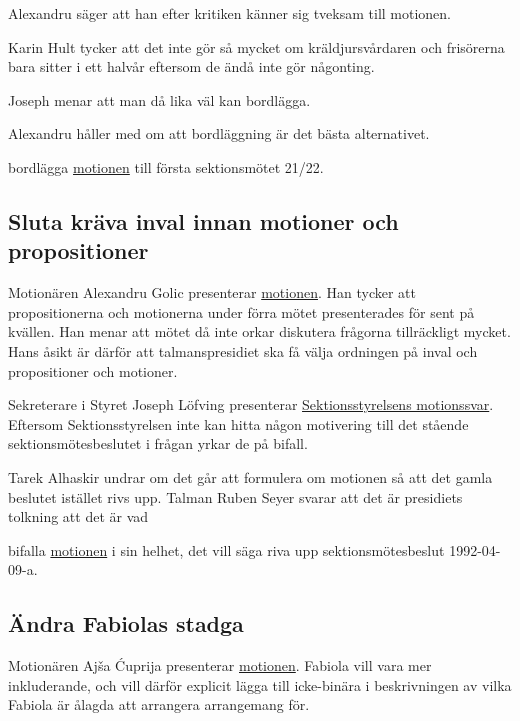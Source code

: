 \documentclass[hidelinks]{sektionsmote}
\begin{document}
Alexandru säger att han efter kritiken känner sig tveksam till motionen.

Karin Hult tycker att det inte gör så mycket om kräldjursvårdaren och frisörerna bara sitter i ett halvår eftersom de ändå inte gör någonting.

Joseph menar att man då lika väl kan bordlägga.

Alexandru håller med om att bordläggning är det bästa alternativet.

\begin{beslut}
  \item bordlägga \hyperlink{bilagor/motion/a.pdf.1}{motionen} till första sektionsmötet 21/22.
\end{beslut}

\subsection{Sluta kräva inval innan motioner och propositioner}
Motionären Alexandru Golic presenterar \hyperlink{bilagor/motion/b.pdf.1}{motionen}.
Han tycker att propositionerna och motionerna under förra mötet presenterades för sent på kvällen.
Han menar att mötet då inte orkar diskutera frågorna tillräckligt mycket.
Hans åsikt är därför att talmanspresidiet ska få välja ordningen på inval och propositioner och motioner.

Sekreterare i Styret Joseph Löfving presenterar \hyperlink{bilagor/motion/bsvar.pdf.1}{Sektionsstyrelsens motionssvar}.
Eftersom Sektionsstyrelsen inte kan hitta någon motivering till det stående sektionsmötesbeslutet i frågan yrkar de på bifall.

Tarek Alhaskir undrar om det går att formulera om motionen så att det gamla beslutet istället rivs upp.
Talman Ruben Seyer svarar att det är presidiets tolkning att det är vad

\begin{beslut}
  \item bifalla \hyperlink{bilagor/motion/b.pdf.1}{motionen} i sin helhet, det vill säga riva upp sektionsmötesbeslut 1992-04-09-a.
\end{beslut}

\subsection{Ändra Fabiolas stadga}
Motionären Ajša Ćuprija presenterar \hyperlink{bilagor/motion/c.pdf.1}{motionen}.
Fabiola vill vara mer inkluderande, och vill därför explicit lägga till icke-binära i beskrivningen av vilka Fabiola är ålagda att arrangera arrangemang för.
\end{document}
